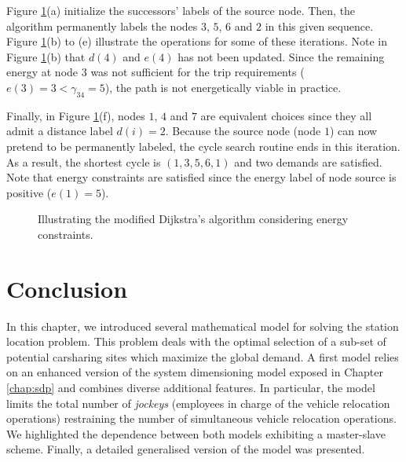 \begin{bibunit}[ieeetr]
\medskip
Figure \ref{fig:heuristicExample}(a) initialize the successors' labels of the source node.
Then, the algorithm permanently labels the nodes $3$, $5$, $6$ and $2$ in this given sequence.
Figure \ref{fig:heuristicExample}(b) to (e) illustrate the operations for some of these iterations.
Note in Figure \ref{fig:heuristicExample}(b) that $d(4)$ and $e(4)$ has not been updated.
Since the remaining energy at node $3$ was not sufficient for the trip requirements ($e(3) = 3 < \gamma_{34} = 5$), the path is not energetically viable in practice.

\medskip
Finally, in Figure \ref{fig:heuristicExample}(f), nodes $1$, $4$ and $7$ are equivalent choices since they all admit a distance label $d(i) = 2$.
Because the source node (node $1$) can now pretend to be permanently labeled, the cycle search routine ends in this iteration.
As a result, the shortest cycle is $(1, 3, 5, 6, 1)$ and two demands are satisfied.
Note that energy constraints are satisfied since the energy label of node source is positive ($e(1) = 5$).

\begin{figure}[t]
\centering
\scalebox{.9}{}
\caption{Illustrating the modified Dijkstra's algorithm considering energy constraints.}
\label{fig:heuristicExample}
\end{figure}

\newpage
\section{Conclusion}
In this chapter, we introduced several mathematical model for solving the station location problem.
This problem deals with the optimal selection of a sub-set of potential carsharing sites which maximize the global demand.
A first model {\SLP} relies on an enhanced version of the system dimensioning model {\SDP} exposed in Chapter \ref{chap:sdp} and combines diverse additional features.
In particular, the model limits the total number of \emph{jockeys} (employees in charge of the vehicle relocation operations) restraining the number of simultaneous vehicle relocation operations.
We highlighted the dependence between both models exhibiting a master-slave scheme.
Finally, a detailed {\SDP} generalised version of the {\SLP} model was presented.


\end{bibunit}
